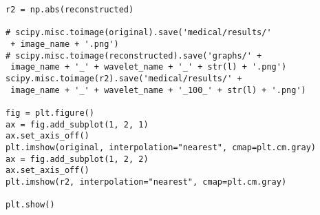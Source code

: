 \begin{lstlisting}
r2 = np.abs(reconstructed)

# scipy.misc.toimage(original).save('medical/results/'
 + image_name + '.png')
# scipy.misc.toimage(reconstructed).save('graphs/' +
 image_name + '_' + wavelet_name + '_' + str(l) + '.png')
scipy.misc.toimage(r2).save('medical/results/' +
 image_name + '_' + wavelet_name + '_100_' + str(l) + '.png')

fig = plt.figure()
ax = fig.add_subplot(1, 2, 1)
ax.set_axis_off()
plt.imshow(original, interpolation="nearest", cmap=plt.cm.gray)
ax = fig.add_subplot(1, 2, 2)
ax.set_axis_off()
plt.imshow(r2, interpolation="nearest", cmap=plt.cm.gray)

plt.show()

\end{lstlisting}
